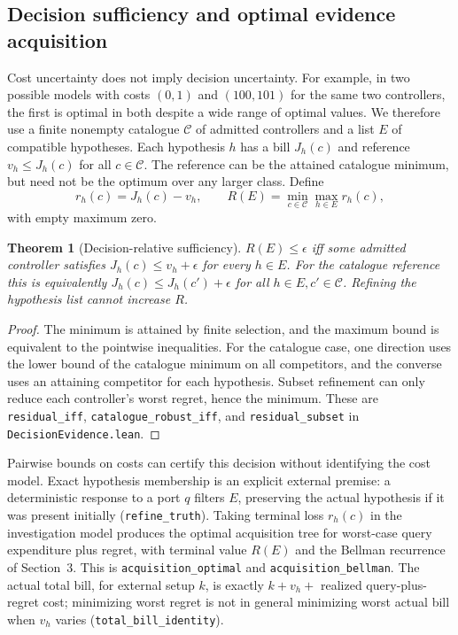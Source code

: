 \documentclass[10pt,letterpaper]{article}
\newtheorem{theorem}{Theorem}[section]
\newcommand{\rc}[1]{\texttt{#1}}
\begin{document}
\subsection{Decision sufficiency and optimal evidence acquisition}
Cost uncertainty does not imply decision uncertainty. For example, in two possible models with costs $(0,1)$ and $(100,101)$ for the same two controllers, the first is optimal in both despite a wide range of optimal values. We therefore use a finite nonempty catalogue $\mathcal C$ of admitted controllers and a list $E$ of compatible hypotheses. Each hypothesis $h$ has a bill $J_h(c)$ and reference $v_h\le J_h(c)$ for all $c\in\mathcal C$. The reference can be the attained catalogue minimum, but need not be the optimum over any larger class. Define
\[
 r_h(c)=J_h(c)-v_h,\qquad R(E)=\min_{c\in\mathcal C}\max_{h\in E}r_h(c),
\]
with empty maximum zero.
\begin{theorem}[Decision-relative sufficiency]\label{thm:decision}
$R(E)\le\epsilon$ iff some admitted controller satisfies $J_h(c)\le v_h+\epsilon$ for every $h\in E$. For the catalogue reference this is equivalently $J_h(c)\le J_h(c')+\epsilon$ for all $h\in E,c'\in\mathcal C$. Refining the hypothesis list cannot increase $R$.
\end{theorem}
\begin{proof}
The minimum is attained by finite selection, and the maximum bound is equivalent to the pointwise inequalities. For the catalogue case, one direction uses the lower bound of the catalogue minimum on all competitors, and the converse uses an attaining competitor for each hypothesis. Subset refinement can only reduce each controller's worst regret, hence the minimum. These are \rc{residual\_iff}, \rc{catalogue\_robust\_iff}, and \rc{residual\_subset} in \rc{DecisionEvidence.lean}.
\end{proof}
Pairwise bounds on costs can certify this decision without identifying the cost model. Exact hypothesis membership is an explicit external premise: a deterministic response to a port $q$ filters $E$, preserving the actual hypothesis if it was present initially (\rc{refine\_truth}). Taking terminal loss $r_h(c)$ in the investigation model produces the optimal acquisition tree for worst-case query expenditure plus regret, with terminal value $R(E)$ and the Bellman recurrence of Section~3. This is \rc{acquisition\_optimal} and \rc{acquisition\_bellman}. The actual total bill, for external setup $k$, is exactly $k+v_h+$ realized query-plus-regret cost; minimizing worst regret is not in general minimizing worst actual bill when $v_h$ varies (\rc{total\_bill\_identity}).
\end{document}
